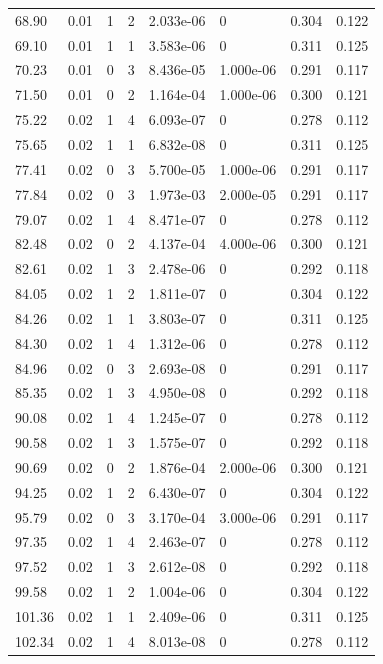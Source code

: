 \documentclass[preview]{standalone}
\begin{document}
{{{\begin{tabular}{L{1.2cm}C{1.2cm} C{0.3cm}C{0.5cm} C{1.4cm}C{1.4cm} C{1.4cm}C{1.4cm}}
  68.90  &  0.01  & 1     &  2 &  2.033e-06  & 0  & 0.304 &  0.122   \\ 
  69.10  &  0.01  & 1     &  1 &  3.583e-06  & 0  & 0.311 &  0.125   \\ 
  70.23  &  0.01  & 0     &  3 &  8.436e-05  & 1.000e-06  & 0.291 &  0.117   \\ 
  71.50  &  0.01  & 0     &  2 &  1.164e-04  & 1.000e-06  & 0.300 &  0.121   \\ 
  75.22  &  0.02  & 1     &  4 &  6.093e-07  & 0  & 0.278 &  0.112   \\ 
  75.65  &  0.02  & 1     &  1 &  6.832e-08  & 0  & 0.311 &  0.125   \\ 
  77.41  &  0.02  & 0     &  3 &  5.700e-05  & 1.000e-06  & 0.291 &  0.117   \\ 
  77.84  &  0.02  & 0     &  3 &  1.973e-03  & 2.000e-05  & 0.291 &  0.117   \\ 
  79.07  &  0.02  & 1     &  4 &  8.471e-07  & 0  & 0.278 &  0.112   \\ 
  82.48  &  0.02  & 0     &  2 &  4.137e-04  & 4.000e-06  & 0.300 &  0.121   \\ 
  82.61  &  0.02  & 1     &  3 &  2.478e-06  & 0  & 0.292 &  0.118   \\ 
  84.05  &  0.02  & 1     &  2 &  1.811e-07  & 0  & 0.304 &  0.122   \\ 
  84.26  &  0.02  & 1     &  1 &  3.803e-07  & 0  & 0.311 &  0.125   \\ 
  84.30  &  0.02  & 1     &  4 &  1.312e-06  & 0  & 0.278 &  0.112   \\ 
  84.96  &  0.02  & 0     &  3 &  2.693e-08  & 0  & 0.291 &  0.117   \\ 
  85.35  &  0.02  & 1     &  3 &  4.950e-08  & 0  & 0.292 &  0.118   \\ 
  90.08  &  0.02  & 1     &  4 &  1.245e-07  & 0  & 0.278 &  0.112   \\ 
  90.58  &  0.02  & 1     &  3 &  1.575e-07  & 0  & 0.292 &  0.118   \\ 
  90.69  &  0.02  & 0     &  2 &  1.876e-04  & 2.000e-06  & 0.300 &  0.121   \\ 
  94.25  &  0.02  & 1     &  2 &  6.430e-07  & 0  & 0.304 &  0.122   \\ 
  95.79  &  0.02  & 0     &  3 &  3.170e-04  & 3.000e-06  & 0.291 &  0.117   \\ 
  97.35  &  0.02  & 1     &  4 &  2.463e-07  & 0  & 0.278 &  0.112   \\ 
  97.52  &  0.02  & 1     &  3 &  2.612e-08  & 0  & 0.292 &  0.118   \\ 
  99.58  &  0.02  & 1     &  2 &  1.004e-06  & 0  & 0.304 &  0.122   \\ 
  101.36  &  0.02  & 1     &  1 &  2.409e-06  & 0  & 0.311 &  0.125   \\ 
  102.34  &  0.02  & 1     &  4 &  8.013e-08  & 0  & 0.278 &  0.112   \\ 
\hline 
\end{tabular} 

}}}
\end{document}

